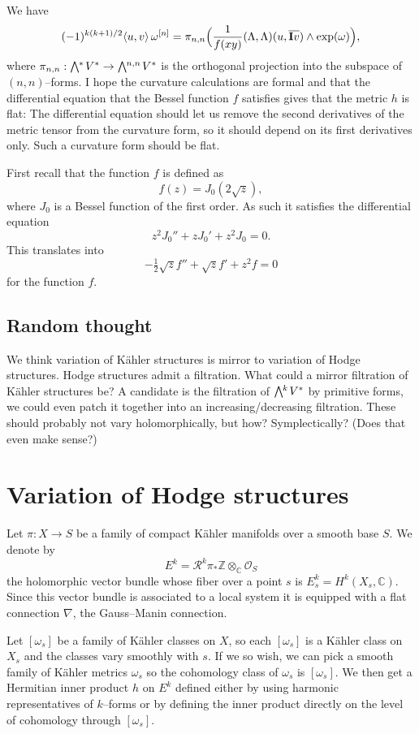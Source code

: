 \documentclass[11pt,a4paper]{amsart}
\def\^#1{^{[#1]}}
\def\bw#1{\bigwedge{}^{\mkern-5mu #1}\mkern2mu}
\def\I{\mathbf{I}}
\def\la{\langle}
\def\ra{\rangle}
\def\ZZ{\mathbb{Z}}
\def\CC{\mathbb{C}}
\def\RR{\mathcal{R}}
\def\OO{\mathcal{O}}
\theoremstyle{definition}
\theoremstyle{remark}
\numberwithin{equation}{section}
\begin{document}
We have
$$
(-1)^{k(k+1)/2}
\la u,v \ra \, \omega\^n
= 
\pi_{n,n}\Bigl(
\frac{1}{f(xy)}(\Lambda,\Lambda)(u,\overline{\I v})
\wedge \exp(\omega)
\Bigr),
$$
where $\pi_{n,n} : \bw{*} V^* \to \bw{n,n} V^*$ is the orthogonal
projection into the subspace of $(n,n)$--forms. I hope the curvature
calculations are formal and that the differential equation that the Bessel
function $f$ satisfies gives that the metric $h$ is flat: The differential
equation should let us remove the second derivatives of the metric tensor
from the curvature form, so it should depend on its first derivatives
only. Such a curvature form should be flat.

First recall that the function $f$ is defined as
$$
f(z) = J_0(2\sqrt z),
$$
where $J_0$ is a Bessel function of the first order. As such it satisfies
the differential equation
$$
z^{2} J_0'' + z J_0' + z^{2} J_0 = 0.
$$
This translates into
$$
-\tfrac 12 \sqrt z f'' + \sqrt z f' + z^{2} f = 0
$$
for the function $f$.



\subsection*{Random thought}

We think variation of K\"ahler structures is mirror to variation of Hodge
structures. Hodge structures admit a filtration. What could a
mirror filtration of K\"ahler structures be? A candidate is the filtration
of $\bw{k}V^{*}$ by primitive forms, we could even patch it together into
an increasing/decreasing filtration. These should probably not vary
holomorphically, but how? Symplectically? (Does that even make sense?)



\section{Variation of Hodge structures}


Let $\pi : X \to S$ be a family of compact K\"ahler manifolds over a
smooth base $S$. We denote by
$$
E^k = \RR^k \pi_* \ZZ \otimes_{\CC} \OO_S
$$
the holomorphic vector bundle whose fiber over a point $s$ is $E^k_s =
H^k(X_s,\CC)$. Since this vector bundle is associated to a local system it
is equipped with a flat connection $\nabla$, the Gauss--Manin connection.

Let $[\omega_s]$ be a family of K\"ahler classes on $X$, so each
$[\omega_s]$ is a K\"ahler class on $X_s$ and the classes vary smoothly
with $s$. If we so wish, we can pick a smooth family of K\"ahler metrics
$\omega_s$ so the cohomology class of $\omega_s$ is $[\omega_s]$. We then
get a Hermitian inner product $h$ on $E^{k}$ defined either by using
harmonic representatives of $k$--forms or by defining the inner product
directly on the level of cohomology through $[\omega_s]$.
\end{document}
